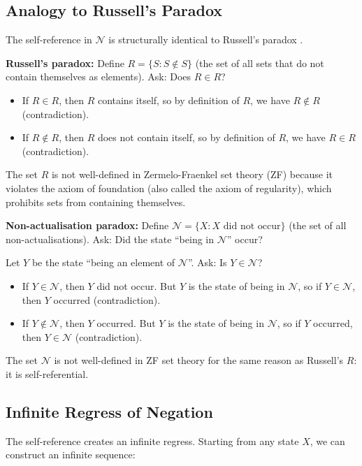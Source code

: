 \documentclass[twocolumn,10pt]{article}
\theoremstyle{definition}
\theoremstyle{remark}
\begin{document}
\subsection{Analogy to Russell's Paradox}

The self-reference in $\mathcal{N}$ is structurally identical to Russell's paradox \cite{russell1903}.

\textbf{Russell's paradox:} Define $R = \{S : S \notin S\}$ (the set of all sets that do not contain themselves as elements). Ask: Does $R \in R$?

\begin{itemize}
\item If $R \in R$, then $R$ contains itself, so by definition of $R$, we have $R \notin R$ (contradiction).
\item If $R \notin R$, then $R$ does not contain itself, so by definition of $R$, we have $R \in R$ (contradiction).
\end{itemize}

The set $R$ is not well-defined in Zermelo-Fraenkel set theory (ZF) because it violates the axiom of foundation (also called the axiom of regularity), which prohibits sets from containing themselves.

\textbf{Non-actualisation paradox:} Define $\mathcal{N} = \{X : X \text{ did not occur}\}$ (the set of all non-actualisations). Ask: Did the state ``being in $\mathcal{N}$'' occur?

Let $Y$ be the state ``being an element of $\mathcal{N}$''. Ask: Is $Y \in \mathcal{N}$?

\begin{itemize}
\item If $Y \in \mathcal{N}$, then $Y$ did not occur. But $Y$ is the state of being in $\mathcal{N}$, so if $Y \in \mathcal{N}$, then $Y$ occurred (contradiction).
\item If $Y \notin \mathcal{N}$, then $Y$ occurred. But $Y$ is the state of being in $\mathcal{N}$, so if $Y$ occurred, then $Y \in \mathcal{N}$ (contradiction).
\end{itemize}

The set $\mathcal{N}$ is not well-defined in ZF set theory for the same reason as Russell's $R$: it is self-referential.

\subsection{Infinite Regress of Negation}

The self-reference creates an infinite regress. Starting from any state $X$, we can construct an infinite sequence:
\end{document}
